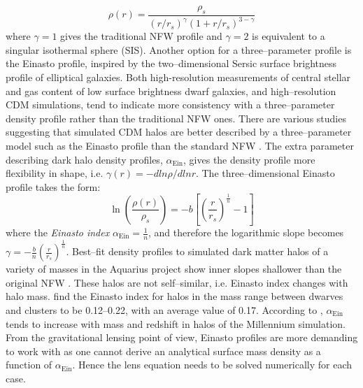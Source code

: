 \documentclass[paper=a4, fontsize=11pt]{scrartcl} %
\numberwithin{equation}{section} %
\numberwithin{figure}{section} %
\numberwithin{table}{section} %
\begin{document}
\begin{equation}
\rho(r) = \frac{\rho_s}{(r / r_s)^\gamma(1 + r/r_s)^{3-\gamma}} \nonumber
\end{equation}
where $\gamma = 1$ gives the traditional NFW profile and $\gamma = 2$ is equivalent to a singular isothermal sphere (SIS).
Another option for a three--parameter profile is the Einasto profile, inspired by the two--dimensional Sersic surface brightness profile of elliptical galaxies. Both high-resolution measurements of central stellar and gas content of low surface brightness dwarf galaxies, and high--resolution CDM simulations, tend to indicate more consistency with a three--parameter density profile rather than the traditional NFW ones. There are various studies suggesting that simulated CDM halos are better described by a three--parameter model such as the Einasto profile than the standard NFW \citep[e.g.][]{Navarro+2004, Gao+2008, DiCintio+2014, Duttonandmaccio2014}. The extra parameter describing dark halo density profiles, $\alpha_\mathrm{Ein}$, gives the density profile more flexibility in shape, i.e. $\gamma(r) = -dln\rho/dlnr$. The three--dimensional Einasto profile takes the form:
\begin{equation}
\ln\left(\frac{\rho(r)}{\rho_s}\right) = -b\left[\left(\frac{r}{r_s}\right)^{\frac{1}{n}} - 1\right] \nonumber
\end{equation}
where the \emph{Einasto index} $\alpha_\mathrm{Ein} = \frac{1}{n}$, and therefore the logarithmic slope becomes $\gamma = -\frac{b}{n}(\frac{r}{r_s})^\frac{1}{n}$. Best--fit density profiles to simulated dark matter halos of a variety of masses in the Aquarius project show inner slopes shallower than the original NFW \citep{Navarro+2010}. These halos are not self--similar, i.e. Einasto index changes with halo mass. \citet{Navarro+2004} find the Einasto index for halos in the mass range between dwarves and clusters to be 0.12--0.22, with an average value of 0.17. According to \citet{Hayashiandwhite2008, Gao+2008}, $\alpha_\mathrm{Ein}$ tends to increase with mass and redshift in halos of the Millennium simulation. From the gravitational lensing point of view, Einasto profiles are more demanding to work with as one cannot derive an analytical surface mass density as a function of $\alpha_\mathrm{Ein}$. Hence the lens equation needs to be solved numerically for each case.
\end{document}
